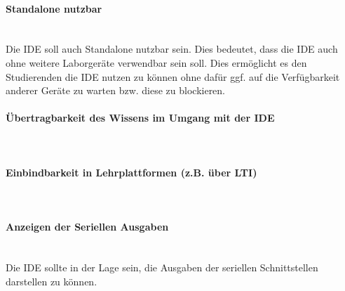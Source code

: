 \paragraph{Standalone nutzbar} \mbox{} \\
Die IDE soll auch Standalone nutzbar sein. Dies bedeutet, dass die IDE auch ohne weitere Laborgeräte verwendbar sein soll. Dies ermöglicht es den Studierenden die IDE nutzen zu können ohne dafür ggf. auf die Verfügbarkeit anderer Geräte zu warten bzw. diese zu blockieren.

\paragraph{Übertragbarkeit des Wissens im Umgang mit der IDE} \mbox{} \\


\paragraph{Einbindbarkeit in Lehrplattformen (z.B. über LTI)} \mbox{} \\


\paragraph{Anzeigen der Seriellen Ausgaben} \mbox{} \\
Die IDE sollte in der Lage sein, die Ausgaben der seriellen Schnittstellen darstellen zu können.
